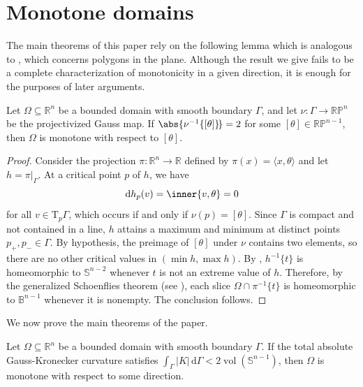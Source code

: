 \section{Monotone domains}

The main theorems of this paper rely on the following lemma which is analogous to \cite[Theorem 1]{preparata1981}, which concerns polygons in the plane. Although the result we give fails to be a complete characterization of monotonicity in a given direction, it is enough for the purposes of later arguments.

\begin{lemma}\label{lem:headphones}
  Let $\Omega \subseteq \mathbb{R}^n$ be a bounded domain with smooth boundary $\Gamma$, and let ${\nu \colon \Gamma \to \mathbb{RP}^n}$ be the projectivized Gauss map. If $\abs{\nu^{-1}\{[\theta]\}\hspace{-1.5pt}} = 2$ for some $[\theta] \in \mathbb{RP}^{n-1}$, then $\Omega$ is monotone with respect to $[\theta]$.
\end{lemma}
\begin{proof}
  Consider the projection $\pi \colon 
  \mathbb{R}^n \to \mathbb{R}$ defined by $\pi(x) = \langle x, \theta \rangle$ and let $h = \pi|_\Gamma$. At a critical point $p$ of $h$, we have 
  \begin{equation*}
    \mathrm{d}h_p(v) = \inner{v, \theta} = 0
  \end{equation*}
  for all $v \in \mathrm{T}_p \Gamma$, which occurs if and only if $\nu(p) = [\theta]$. Since $\Gamma$ is compact and not contained in a line, $h$ attains a maximum and minimum at distinct points $p_{+}, p_{-} \in \Gamma$. By hypothesis, the preimage of $[\theta]$ under $\nu$ contains two elements, so there are no other critical values in $(\min h, \max h)$. By \cite[Theorem A]{yasuhiko2015}, $h^{-1}\{t\}$ is homeomorphic to $\mathbb{S}^{n-2}$ whenever $t$ is not an extreme value of $h$. Therefore, by the generalized Schoenflies theorem (see \cite{putman2025}), each slice $\Omega \cap \pi^{-1}\{t\}$ is homeomorphic to $\mathbb{B}^{n-1}$ whenever it is nonempty. The conclusion follows.
\end{proof}

We now prove the main theorems of the paper.

\begin{theorem}\label{thm:curvature}
    Let $\Omega \subseteq \mathbb{R}^n$ be a bounded domain with smooth boundary $\Gamma$. If the total absolute Gauss-Kronecker curvature satisfies $\int_{\Gamma} |K| \, \mathrm{d}\Gamma < 2\operatorname{vol}(\mathbb{S}^{n-1})$, then $\Omega$ is monotone with respect to some direction.
\end{theorem}

